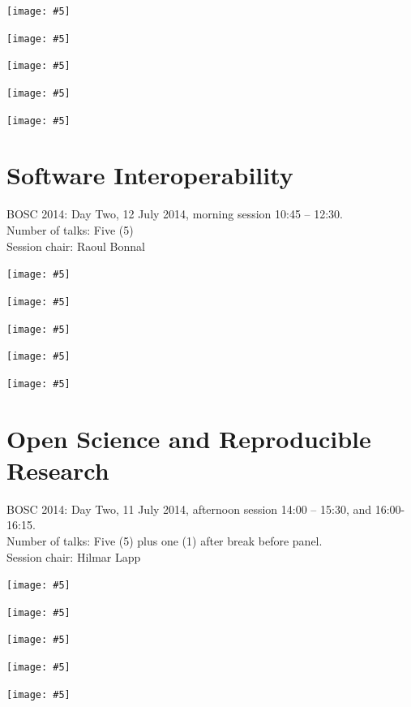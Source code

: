 \documentclass[10pt,oneside]{article}
\newcommand{\embed}[5]{\begin{center}\texttt{[image: \#5]}\end{center}}
\begin{document}
\embed{2.5cm}{7cm}{2.5cm}{2.5cm}{Updates-20-BioMart.pdf}
\embed{2.5cm}{3cm}{2cm}{2.5cm}{Updates-25-Biocaml.pdf}
\embed{2.5cm}{2.5cm}{2.5cm}{3cm}{Updates-41-BioRuby.pdf}
\embed{1.5cm}{1.5cm}{1.5cm}{1cm}{Updates-19-Biopython.pdf}
\embed{2cm}{3cm}{2cm}{2.5cm}{Updates-02-UGENE.pdf}

\newpage
\section*{Software Interoperability}
BOSC 2014: Day Two, 12 July 2014, morning session 10:45 -- 12:30. \\
\noindent Number of talks: Five (5) \\
\noindent Session chair: Raoul Bonnal

\embed{2.5cm}{3cm}{2.5cm}{2.5cm}{Interoperability-04-Pathview.pdf}
\embed{2.5cm}{2.5cm}{2cm}{2.5cm}{Interoperability-13-Mobyle2.pdf}
\embed{2.5cm}{2cm}{2cm}{3cm}{Interoperability-34-OWL-computing.pdf}
\embed{2cm}{2.5cm}{2cm}{3.5cm}{Interoperability-14-Taverna-player.pdf}
\embed{2.5cm}{2.5cm}{2.5cm}{3cm}{Interoperability-40-Small-Tools.pdf}

\newpage
\section*{Open Science and Reproducible Research }
BOSC 2014: Day Two, 11 July 2014, afternoon session 14:00 -- 15:30, and 16:00-16:15. \\
\noindent Number of talks: Five (5) plus one (1) after break before panel. \\
\noindent Session chair: Hilmar Lapp

\embed{2.5cm}{10cm}{2cm}{2.5cm}{OpenScience-11-SEEK.pdf}
\embed{2.5cm}{5cm}{2.5cm}{2.5cm}{OpenScience-31-Arvados.pdf}
\embed{2.5cm}{2.5cm}{2.5cm}{2.5cm}{OpenScience-35-Galaxy-community.pdf}
\embed{2.5cm}{5cm}{2.5cm}{2.5cm}{OpenScience-23-Community-Pipelines.pdf}
\embed{2.5cm}{3cm}{2.5cm}{3cm}{OpenScience-26-Open-Tree-of-Life.pdf}
\end{document}
